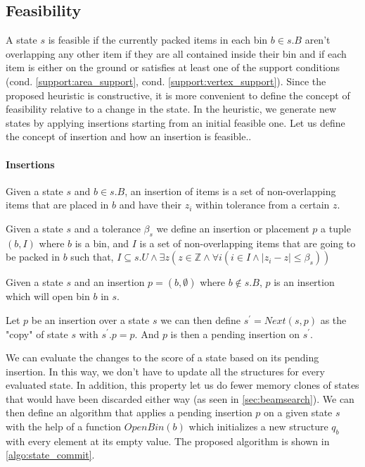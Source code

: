 \subsection{Feasibility}
\label{sec:problem_state:feasibility}%
A state $s$ is feasible if the currently packed items in each bin $b \in s.B$ aren't overlapping any other item if they are all contained inside their bin and if each item is either on the ground or satisfies at least one of the support conditions (cond. \ref{support:area_support}, cond. \ref{support:vertex_support}).
Since the proposed heuristic is constructive, it is more convenient to define the concept of feasibility relative to a change in the state.
In the heuristic, we generate new states by applying insertions starting from an initial feasible one. Let us define the concept of insertion and how an insertion is feasible..
\paragraph*{Insertions}

Given a state $s$ and $b \in s.B$, an insertion of items is a set of non-overlapping items that are placed in $b$ and have their $z_i$ within tolerance from a certain $z$.
\begin{definition}[Insertion]
    \label{def:insertion}%
    Given a state $s$ and a tolerance $\beta_s$ we define an insertion or placement $p$ a tuple $(b, I)$ where $b$ is a bin, and $I$ is a set of non-overlapping items that are going to be packed in $b$ such that, $I \subseteq s.U \land \exists z (z \in \mathbb{Z} \land \forall i ( i \in I \land |z_i - z| \le \beta_s))$
\end{definition}
\begin{observation}
    \label{oss:state_bin_open}
    Given a state $s$ and an insertion $p = (b, \emptyset)$ where $b \notin s.B$, $p$ is an insertion which will open bin $b$ in $s$.
\end{observation}

\begin{definition}[Next]
    \label{def:state_next}%
    Let $p$ be an insertion over a state $s$ we can then define $s^\prime = Next(s, p)$ as the "copy" of state $s$ with $s^\prime.p = p$. And $p$ is then a pending insertion on $s^\prime$.
\end{definition}

We can evaluate the changes to the score of a state based on its pending insertion. 
In this way, we don't have to update all the structures for every evaluated state. 
In addition, this property let us do fewer memory clones of states that would have been discarded either way (as seen in \cref{sec:beamsearch}). 
We can then define an algorithm that applies a pending insertion $p$ on a given state $s$ with the help of a function $OpenBin(b)$ which initializes a new structure $q_b$ with every element at its empty value.
The proposed algorithm is shown in \ref{algo:state_commit}.

